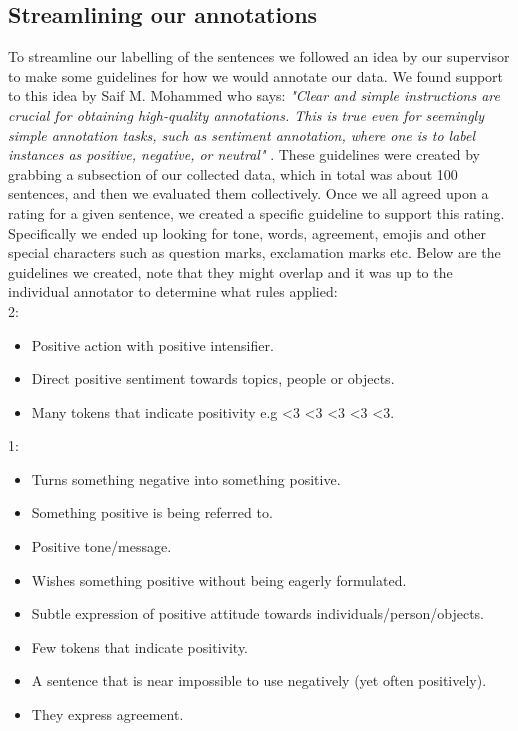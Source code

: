 \subsection{Streamlining our annotations}
To streamline our labelling of the sentences we followed an idea by our supervisor to make some guidelines for how we would annotate our data. We found support to this idea by Saif M. Mohammed who says: \textit{"Clear and simple instructions are crucial for obtaining high-quality annotations. This is true even for
seemingly simple annotation tasks, such as sentiment annotation, where one is to label instances as
positive, negative, or neutral"} \cite{saif}. These guidelines were created by grabbing a subsection of our collected data, which in total was about 100 sentences, and then we evaluated them collectively. Once we all agreed upon a rating for a given sentence, we created a specific guideline to support this rating. Specifically we ended up looking for tone, words, agreement, emojis and other special characters such as question marks, exclamation marks etc. Below are the guidelines we created, note that they might overlap and it was up to the individual annotator to determine what rules applied: \\
2:
\begin{itemize}
	\itemsep-0.3em
	\item Positive action with positive intensifier.
	\item Direct positive sentiment towards topics, people or objects.
	\item Many tokens that indicate positivity e.g \textless3  \textless3 \textless3 \textless3 \textless3.
\end{itemize}
1:
\begin{itemize}
	\itemsep-0.3em
	\item Turns something negative into something positive.
	\item Something positive is being referred to.
	\item Positive tone/message.
	\item Wishes something positive without being eagerly formulated.
	\item Subtle expression of positive attitude towards individuals/person/objects.
	\item Few tokens that indicate positivity.
	\item A sentence that is near impossible to use negatively (yet often positively).
	\item They express agreement.
\end{itemize}
